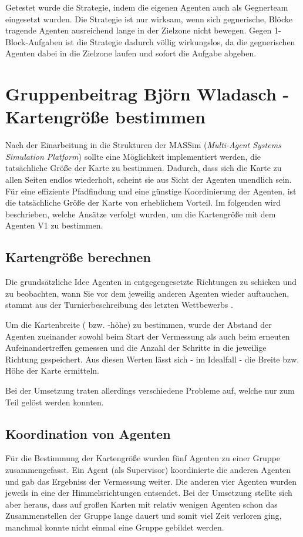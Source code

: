 \documentclass[runningheads]{llncs}
\begin{document}
Getestet wurde die Strategie, indem die eigenen Agenten auch als Gegnerteam eingesetzt wurden. Die Strategie ist nur wirksam, wenn sich gegnerische, Blöcke tragende Agenten ausreichend lange in der Zielzone nicht bewegen. Gegen 1-Block-Aufgaben ist die Strategie dadurch völlig wirkungslos, da die gegnerischen Agenten dabei in die Zielzone laufen und sofort die Aufgabe abgeben.

\section{Gruppenbeitrag Björn Wladasch - Kartengröße bestimmen}
Nach der Einarbeitung in die Strukturen der MASSim (\textit{Multi-Agent Systems Simulation Platform}) \cite{EISMASSim} sollte eine Möglichkeit implementiert werden, die tatsächliche Größe der Karte zu bestimmen.
Dadurch, dass sich die Karte zu allen Seiten endlos wiederholt, scheint sie aus Sicht der Agenten unendlich sein. Für eine effiziente Pfadfindung und eine günstige Koordinierung der Agenten, ist  die tatsächliche Größe der Karte von erheblichem Vorteil. Im folgenden wird beschrieben, welche Ansätze verfolgt wurden, um die Kartengröße mit dem Agenten V1 zu bestimmen.

\subsection{Kartengröße berechnen}
Die grundsätzliche Idee Agenten in entgegengesetzte Richtungen zu schicken und zu beobachten, wann Sie vor dem jeweilig anderen Agenten wieder auftauchen, stammt aus der Turnierbeschreibung des letzten Wettbewerbs \cite[S.136]{MAPC2021}.

Um die Kartenbreite ( bzw. -höhe) zu bestimmen, wurde der Abstand der Agenten zueinander sowohl beim Start der Vermessung als auch beim erneuten Aufeinandertreffen gemessen und die Anzahl der Schritte in die jeweilige Richtung gespeichert. Aus diesen Werten lässt sich - im Idealfall - die Breite bzw. Höhe der Karte ermitteln.

Bei der Umsetzung traten allerdings verschiedene Probleme auf, welche nur zum Teil gelöst werden konnten.

\subsection{Koordination von Agenten}
Für die Bestimmung der Kartengröße wurden fünf Agenten zu einer Gruppe zusammengefasst. Ein Agent (als Supervisor) koordinierte die anderen Agenten und gab das Ergebniss der Vermessung weiter. Die anderen vier Agenten wurden jeweils in eine der Himmelsrichtungen entsendet.
Bei der Umsetzung stellte sich aber heraus, dass auf großen Karten mit relativ wenigen Agenten schon das Zusammenstellen der Gruppe lange dauert und somit viel Zeit verloren ging, manchmal konnte nicht einmal eine Gruppe gebildet werden.
\end{document}
